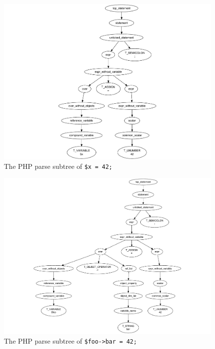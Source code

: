 \begin{figure}[htb]
  \begin{center}
    \includegraphics[trim = 30mm 0mm 50mm 10mm, scale=0.8]{images/simple-variable-assignment}
   \caption{The PHP parse subtree of \texttt{\$x = 42;}}
   \label{fig:simple-variable-assignment}
  \end{center}
\end{figure}

\begin{figure}[htb]
  \begin{center}
    \includegraphics[trim = 60mm 0mm 0mm 20mm, scale=0.8]{images/one-level-field-access-left}
   \caption{The PHP parse subtree of \texttt{\$foo->bar = 42;}}
   \label{fig:one-level-field-access-left}
  \end{center}
\end{figure}

